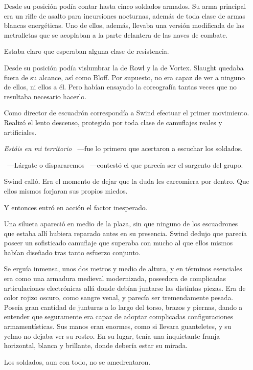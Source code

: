 Desde su posición podía contar hasta cinco soldados armados. Su arma principal era un rifle de asalto para incursiones nocturnas, además de toda clase de armas blancas energéticas. Uno de ellos, además, llevaba una versión modificada de las metralletas que se acoplaban a la parte delantera de las naves de combate.

Estaba claro que esperaban alguna clase de resistencia.

Desde su posición podía vislumbrar la de Rowl y la de Vortex. Slaught quedaba fuera de su alcance, así como Bloff. Por supuesto, no era capaz de ver a ninguno de ellos, ni ellos a él. Pero habían ensayado la coreografía tantas veces que no resultaba necesario hacerlo.

Como director de escuadrón correspondía a Swind efectuar el primer movimiento. Realizó el lento descenso, protegido por toda clase de camuflajes reales y artificiales.

\emph{Estáis en mi territorio} ~---fue lo primero que acertaron a escuchar los soldados.

~---Lárgate o dispararemos ~---contestó el que parecía ser el sargento del grupo.

Swind calló. Era el momento de dejar que la duda les carcomiera por dentro. Que ellos mismos forjaran sus propios miedos.

Y entonces entró en acción el factor inesperado.

Una silueta apareció en medio de la plaza, sin que ninguno de los escuadrones que estaba allí hubiera reparado antes en su presencia. Swind dedujo que parecía poseer un sofisticado camuflaje que superaba con mucho al que ellos mismos habían diseñado tras tanto esfuerzo conjunto.

Se erguía inmensa, unos dos metros y medio de altura, y en términos esenciales era como una armadura medieval modernizada, poseedora de complicadas articulaciones electrónicas allá donde debían juntarse las distintas piezas. Era de color rojizo oscuro, como sangre venal, y parecía ser tremendamente pesada. Poseía gran cantidad de junturas a lo largo del torso, brazos y piernas, dando a entender que seguramente era capaz de adoptar complicadas configuraciones armamentísticas. Sus manos eran enormes, como si llevara guanteletes, y su yelmo no dejaba ver su rostro. En su lugar, tenía una inquietante franja horizontal, blanca y brillante, donde debería estar su mirada.

Los soldados, aun con todo, no se amedrentaron.

